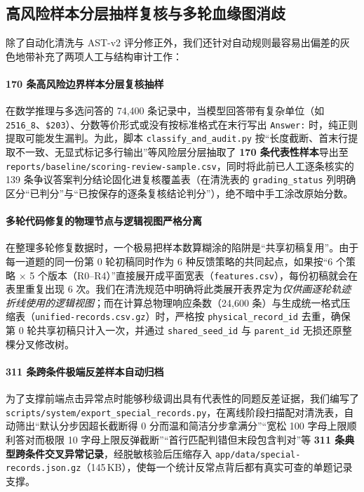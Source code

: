 \subsection{高风险样本分层抽样复核与多轮血缘图消歧}

除了自动化清洗与 AST-v2 评分修正外，我们还针对自动规则最容易出偏差的灰色地带补充了两项人工与结构审计工作：

\paragraph{170 条高风险边界样本分层复核抽样}在数学推理与多选问答的 74,400 条记录中，当模型回答带有复杂单位（如 \texttt{2516\_8}、\texttt{\$203}）、分数等价形式或没有按标准格式在末行写出 \texttt{Answer:} 时，纯正则提取可能发生漏判。为此，脚本 \texttt{classify\_and\_audit.py} 按“长度截断、首末行提取不一致、无显式标记多行输出”等风险层分层抽取了 \textbf{170 条代表性样本}导出至 \texttt{reports/baseline/scoring-review-sample.csv}，同时将此前已人工逐条核实的 139 条争议答案判分结论固化进复核覆盖表（在清洗表的 \texttt{grading\_status} 列明确区分“已判分”与“已按保存的逐条复核结论判分”），绝不暗中手工涂改原始分数。

\paragraph{多轮代码修复的物理节点与逻辑视图严格分离}在整理多轮修复数据时，一个极易把样本数算糊涂的陷阱是“共享初稿复用”。由于每一道题的同一份第 0 轮初稿同时作为 6 种反馈策略的共同起点，如果按“6 个策略 $\times$ 5 个版本（R0–R4）”直接展开成平面宽表（\texttt{features.csv}），每份初稿就会在表里重复出现 6 次。我们在清洗规范中明确将此类展开表界定为\emph{仅供画逐轮轨迹折线使用的逻辑视图}；而在计算总物理响应条数（24,600 条）与生成统一格式压缩表（\texttt{unified-records.csv.gz}）时，严格按 \texttt{physical\_record\_id} 去重，确保第 0 轮共享初稿只计入一次，并通过 \texttt{shared\_seed\_id} 与 \texttt{parent\_id} 无损还原整棵分叉修改树。


\paragraph{311 条跨条件极端反差样本自动归档}为了支撑前端点击异常点时能够秒级调出具有代表性的同题反差证据，我们编写了 \texttt{scripts/system/export\_special\_records.py}，在离线阶段扫描配对清洗表，自动筛出“默认分步因超长截断得 0 分而温和简洁分步拿满分”“宽松 100 字母上限顺利答对而极限 10 字母上限反弹截断”“首行匹配判错但末段包含判对”等 \textbf{311 条典型跨条件交叉异常记录}，经脱敏核验后压缩存入 \texttt{app/data/special-records.json.gz}（145\,KB），使每一个统计反常点背后都有真实可查的单题记录支撑。
